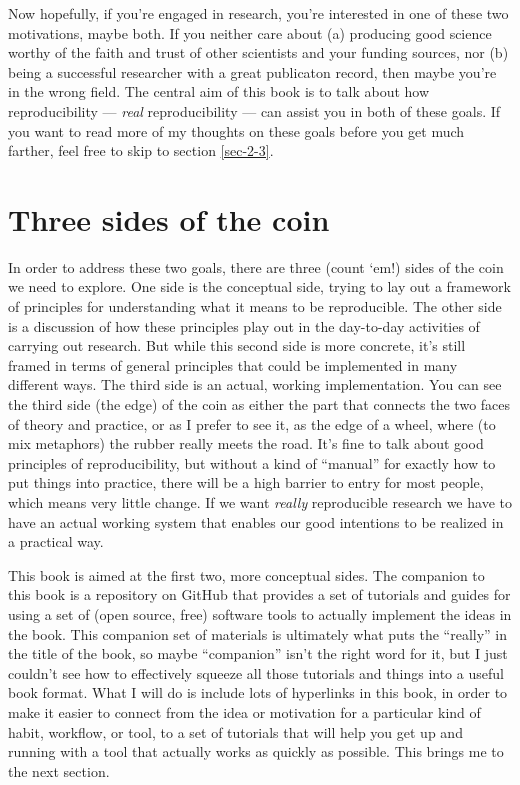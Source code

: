\documentclass{book}
\begin{document}
Now hopefully, if you're engaged in research, you're interested in one of these two motivations, maybe both. If you neither care about (a) producing good science worthy of the faith and trust of other scientists and your funding sources, nor (b) being a successful researcher with a great publicaton record, then maybe you're in the wrong field.  The central aim of this book is to talk about how reproducibility --- \emph{real} reproducibility --- can assist you in both of these goals.  If you want to read more of my thoughts on these goals before you get much farther, feel free to skip to section \ref{sec-2-3}.
\section{Three sides of the coin}
\label{sec-1-2}

In order to address these two goals, there are three (count `em!) sides of the coin we need to explore.  One side is the conceptual side, trying to lay out a framework of principles for understanding what it means to be reproducible.  The other side is a discussion of how these principles play out in the day-to-day activities of carrying out research.  But while this second side is more concrete, it's still framed in terms of general principles that could be implemented in many different ways.  The third side is an actual, working implementation. You can see the third side (the edge) of the coin as either the part that connects the two faces of theory and practice, or as I prefer to see it, as the edge of a wheel, where (to mix metaphors) the rubber really meets the road.  It's fine to talk about good principles of reproducibility, but without a kind of ``manual'' for exactly how to put things into practice, there will be a high barrier to entry for most people, which means very little change. If we want \emph{really} reproducible research we have to have an actual working system that enables our good intentions to be realized in a practical way.

This book is aimed at the first two, more conceptual sides.  The companion to this book is a repository on GitHub that provides a set of tutorials and guides for using a set of (open source, free) software tools to actually implement the ideas in the book.  This companion set of materials is ultimately what puts the ``really'' in the title of the book, so maybe ``companion'' isn't the right word for it, but I just couldn't see how to effectively squeeze all those tutorials and things into a useful book format.  What I will do is include lots of hyperlinks in this book, in order to make it easier to connect from the idea or motivation for a particular kind of habit, workflow, or tool, to a set of tutorials that will help you get up and running with a tool that actually works as quickly as possible.  This brings me to the next section.
\end{document}

